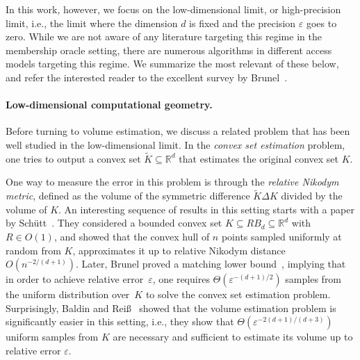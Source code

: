 \documentclass[11pt]{article}
\newcommand{\R}{\ensuremath{\mathbb{R}}}
\begin{document}
    In this work, however, we focus on the low-dimensional limit, or high-precision limit, i.e., the limit where the dimension $d$ is fixed and the precision $\varepsilon$ goes to zero.
    While we are not aware of any literature targeting this regime in the membership oracle setting, there are numerous algorithms in different access models targeting this regime.
    We summarize the most relevant of these below, and refer the interested reader to the excellent survey by Brunel~\cite{brunel2018methods}.

    \paragraph{Low-dimensional computational geometry.}
    Before turning to volume estimation, we discuss a related problem that has been well studied in the low-dimensional limit. In the \textit{convex set estimation} problem, one tries to output a convex set $\widetilde{K} \subseteq \R^d$ that estimates the original convex set $K$.

    One way to measure the error in this problem is through the \textit{relative Nikodym metric}, defined as the volume of the symmetric difference $\widetilde{K} \Delta K$ divided by the volume of $K$. An interesting sequence of results in this setting starts with a paper by Sch\"utt~\cite{schutt1994random}. They considered a bounded convex set $K \subseteq RB_d \subseteq \R^d$ with $R \in O(1)$, and showed that the convex hull of $n$ points sampled uniformly at random from $K$, approximates it up to relative Nikodym distance $O(n^{-2/(d+1)})$. Later, Brunel proved a matching lower bound~\cite{brunel2016adaptive}, implying that in order to achieve relative error~$\varepsilon$, one requires $\Theta(\varepsilon^{-(d+1)/2})$ samples from the uniform distribution over~$K$ to solve the convex set estimation problem. Surprisingly, Baldin and Rei\ss~\cite{baldin2016unbiased} showed that the volume estimation problem is significantly easier in this setting, i.e., they show that $\Theta(\varepsilon^{-2(d+1)/(d+3)})$ uniform samples from $K$ are necessary and sufficient to estimate its volume up to relative error $\varepsilon$.
\end{document}
